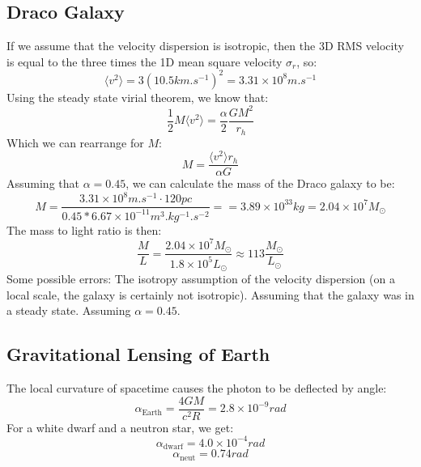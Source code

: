\subsection{Draco Galaxy}
If we assume that the velocity dispersion is isotropic, then the 3D RMS velocity is equal to the three times the 1D mean square velocity $\sigma_r$, so:
\begin{equation}
    \langle v^2 \rangle = 3(10.5 \si{km.s^{-1}})^2 = 3.31 \times 10^8 \si{m.s^{-1}}
\end{equation}
Using the steady state virial theorem, we know that:
\begin{equation}
    \frac{1}{2}M\langle v^2\rangle = \frac{\alpha}{2}\frac{GM^2}{r_h}
\end{equation}
Which we can rearrange for $M$:
\begin{equation}
    M = \frac{\langle v^2\rangle r_h}{\alpha G}
\end{equation}
Assuming that $\alpha = 0.45$, we can calculate the mass of the Draco galaxy to be:
\begin{equation}
    \boxed{M = \frac{3.31 \times 10^8 \si{m.s^{-1}} \cdot 120 \si{pc}}{0.45 * 6.67 \times 10^{-11}\si{m^3.kg^{-1}.s^{-2}}} = = 3.89 \times 10^{33}\si{kg} = 2.04 \times 10^7 M_\odot}
\end{equation}
The mass to light ratio is then:
\begin{equation}
    \boxed{\frac{M}{L} = \frac{2.04 \times 10^7 M_\odot}{1.8\times 10^5 L_\odot} \approx  113\frac{M_\odot}{L_\odot}}
\end{equation}
Some possible errors: The isotropy assumption of the velocity dispersion (on a local scale, the galaxy is certainly not isotropic). Assuming that the galaxy was in a steady state. Assuming $\alpha = 0.45$. 

\subsection{Gravitational Lensing of Earth}
The local curvature of spacetime causes the photon to be deflected by angle:
\begin{equation}
    \boxed{\alpha_{\text{Earth}} = \frac{4GM}{c^2R} = 2.8 \times 10^{-9}\si{rad}}
\end{equation}
For a white dwarf and a neutron star, we get:
\begin{equation}
    \boxed{\alpha_{\text{dwarf}} = 4.0 \times 10^{-4}\si{rad}}
\end{equation}
\begin{equation}
    \boxed{\alpha_{\text{neut}} = 0.74\si{rad}}
\end{equation}

